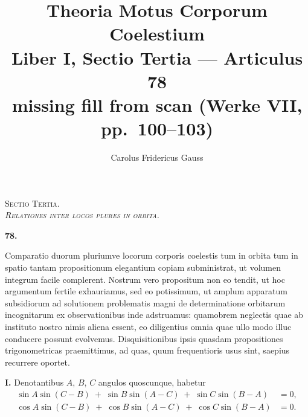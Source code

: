 \documentclass[11pt,a4paper]{article}
\title{Theoria Motus Corporum Coelestium\\[0.4em]
\large Liber I, Sectio Tertia --- Articulus 78\\
missing fill from scan (Werke VII, pp.\ 100--103)}
\author{Carolus Fridericus Gauss}
\date{}
\begin{document}
\maketitle
{}

\begin{center}
\Large\scshape Sectio Tertia.\\[0.3em]
\normalsize\itshape Relationes inter locos plures in orbita.
\end{center}

\vspace{2em}

\begin{center}\textbf{78.}\end{center}

\medskip

Comparatio duorum pluriumve locorum corporis coelestis tum in orbita
tum in spatio tantam propositionum elegantium copiam subministrat, ut
volumen integrum facile complerent. Nostrum vero propositum non eo tendit,
ut hoc argumentum fertile exhauriamus, sed eo potissimum, ut amplum
apparatum subsidiorum ad solutionem problematis magni de determinatione
orbitarum incognitarum ex observationibus inde adstruamus: quamobrem
neglectis quae ab instituto nostro nimis aliena essent, eo diligentius omnia
quae ullo modo illuc conducere possunt evolvemus. Disquisitionibus ipsis
quasdam propositiones trigonometricas praemittimus, ad quas, quum
frequentioris usus sint, saepius recurrere oportet.

\medskip

\textbf{I.} Denotantibus $A$, $B$, $C$ angulos quoscunque, habetur
\begin{align*}
  \sin A \sin(C-B) \;+\; \sin B \sin(A-C) \;+\; \sin C \sin(B-A) &= 0,\\
  \cos A \sin(C-B) \;+\; \cos B \sin(A-C) \;+\; \cos C \sin(B-A) &= 0.
\end{align*}

\medskip
\end{document}
